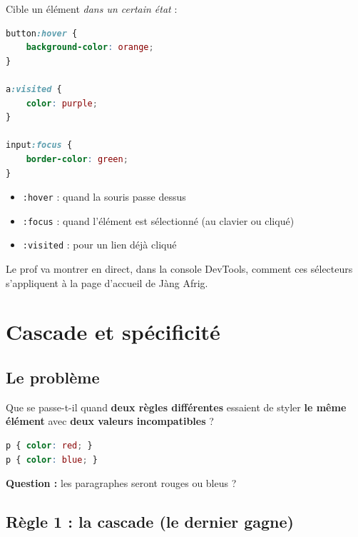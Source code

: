 \documentclass[11pt,a4paper]{article}
\begin{document}
Cible un élément \emph{dans un certain état} :

\begin{lstlisting}[language=CSS]
button:hover {
    background-color: orange;
}

a:visited {
    color: purple;
}

input:focus {
    border-color: green;
}
\end{lstlisting}

\begin{itemize}[nosep]
    \item \texttt{:hover} : quand la souris passe dessus
    \item \texttt{:focus} : quand l'élément est sélectionné (au clavier ou cliqué)
    \item \texttt{:visited} : pour un lien déjà cliqué
\end{itemize}

\begin{infobox}
Le prof va montrer en direct, dans la console DevTools, comment ces
sélecteurs s'appliquent à la page d'accueil de Jàng Afrig.
\end{infobox}

\newpage

\section{Cascade et spécificité}

\subsection{Le problème}

Que se passe-t-il quand \textbf{deux règles différentes} essaient de styler
\textbf{le même élément} avec \textbf{deux valeurs incompatibles} ?

\begin{lstlisting}[language=CSS]
p { color: red; }
p { color: blue; }
\end{lstlisting}

\textbf{Question :} les paragraphes seront rouges ou bleus ?

\subsection{Règle 1 : la cascade (le dernier gagne)}
\end{document}
